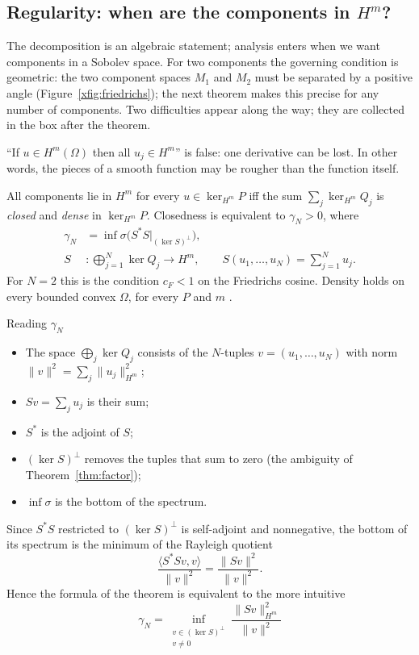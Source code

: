 \subsection{Regularity: when are the components in $H^m$?}\label{ch:regular}
The decomposition is an algebraic statement; analysis enters when we want components in a Sobolev space. For two components the governing condition is geometric: the two component spaces $M_1$ and $M_2$ must be separated by a positive angle (Figure~\ref{xfig:friedrichs}); the next theorem makes this precise for any number of components. Two difficulties appear along the way; they are collected in the box after the theorem.
\begin{proposition}\label{prop:loss}\label{cex:loss}
``If $u\in H^m(\Omega)$ then all $u_j\in H^m$'' is false: one derivative can be lost. In other words, the pieces of a smooth function may be rougher than the function itself.
\end{proposition}
\begin{theorem}\label{xthm:hm}
All components lie in $H^m$ for every $u\in\ker_{H^m}P$ iff the sum $\sum_j\ker_{H^m}Q_j$ is \emph{closed} and \emph{dense} in $\ker_{H^m}P$. Closedness is equivalent to $\gamma_N>0$, where
\[
\begin{aligned}
\gamma_N&=\inf\sigma\big(S^*S\big|_{(\ker S)^\perp}\big),\\
S&:\bigoplus_{j=1}^N\ker Q_j\to H^m,\qquad S(u_1,\dots,u_N)=\sum_{j=1}^Nu_j .
\end{aligned}
\]
For $N=2$ this is the condition $c_F<1$ on the Friedrichs cosine. Density holds on every bounded convex $\Omega$, for every $P$ and $m$  .
\end{theorem}
\begin{notebox}{Reading $\gamma_N$}
\begin{itemize}[nosep]
\item The space $\bigoplus_j\ker Q_j$ consists of the $N$-tuples $v=(u_1,\dots,u_N)$ with norm $\|v\|^2=\sum_j\|u_j\|_{H^m}^2$;
\item $Sv=\sum_ju_j$ is their sum;
\item $S^*$ is the adjoint of $S$;
\item $(\ker S)^\perp$ removes the tuples that sum to zero (the ambiguity of Theorem~\ref{thm:factor});
\item $\inf\sigma$ is the bottom of the spectrum.
\end{itemize}
Since $S^*S$ restricted to $(\ker S)^\perp$ is self-adjoint and nonnegative, the bottom of its spectrum is the minimum of the Rayleigh quotient
\[
\frac{\langle S^*Sv,v\rangle}{\|v\|^2}=\frac{\|Sv\|^2}{\|v\|^2}.
\]
Hence the formula of the theorem is equivalent to the more intuitive
\[
\boxed{\ \gamma_N=\inf_{\substack{v\in(\ker S)^\perp\\ v\ne0}}\frac{\|Sv\|_{H^m}^2}{\|v\|^2}\ }
\]
\end{notebox}

